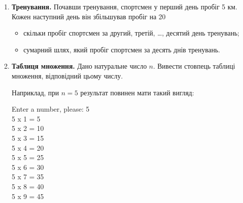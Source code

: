 \begin{enumerate}
\item \textbf{Тренування.} Почавши тренування, спортсмен у перший день пробіг 5 км. Кожен наступний день він збільшував пробіг на 20%
\begin{itemize}[noitemsep, label=\faForward]
\item скільки пробіг спортсмен за другий, третій, \ldots, десятий день тренувань;
\item сумарний шлях, який пробіг спортсмен за десять днів тренувань.
\end{itemize}
\item
\textbf{Таблиця множення.} Дано натуральне число $n$. Вивести стовпець таблиці множення, відповідний цьому числу.

Наприклад, при $n=5$ результат повинен мати такий вигляд:\\
\begin{results}
Enter a number, please: 5\\
5 x 1 = 5\\
5 x 2 = 10\\
5 x 3 = 15\\
5 x 4 = 20\\
5 x 5 = 25\\
5 x 6 = 30\\
5 x 7 = 35\\
5 x 8 = 40\\
5 x 9 = 45\\
\end{results}
\end{enumerate}

 


